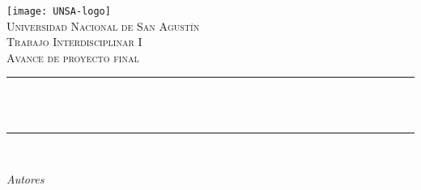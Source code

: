 \begin{titlepage}
  \centering
  \texttt{[image: UNSA-logo]}\\[0.5 cm]
  \textsc{\LARGE Universidad Nacional de San Agustín}\\[1.0 cm]
  \textsc{\Large Trabajo Interdisciplinar I}\\[0.5 cm]
  \textsc{\large Avance de proyecto final}\\[0.5cm]
  \rule{\linewidth}{0.2 mm}\\[0.4 cm]
  {\huge \bfseries \thetitle}\\
  \rule{\linewidth}{0.2 mm}\\[1.5 cm]

  \begin{flushleft}\large
    \emph{Autores}\\
    \theauthor
  \end{flushleft}

  \vfill

  {\large \thedate}

\end{titlepage}